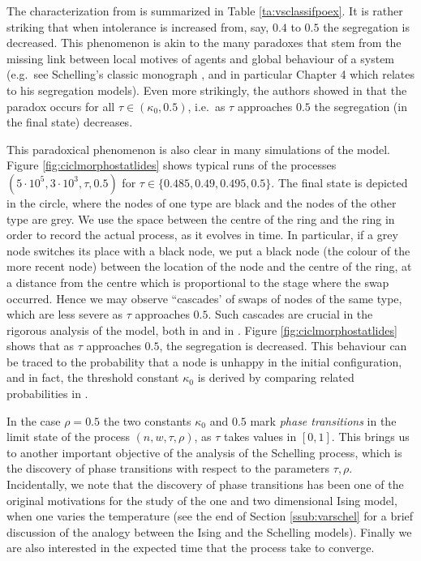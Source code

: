 \documentclass[11pt]{article}
\theoremstyle{plain}
\numberwithin{equation}{subsection}
\begin{document}
The characterization from \cite{BELschel13} is summarized in 
Table \ref{ta:vsclassifpoex}. 
It is rather striking that when intolerance is increased from, say, $0.4$ to $0.5$ 
the segregation is decreased. This phenomenon is akin to the many paradoxes
that stem from the missing link between local motives of agents and global behaviour of
a system (e.g.\ see Schelling's classic monograph \cite{TS2}, and in particular Chapter 4
which relates to his segregation models). 
Even more strikingly, the authors showed in
\cite{BELschel13} that the paradox occurs for all $\tau\in(\kappa_0, 0.5)$, i.e.\ as
$\tau$ approaches $0.5$ the segregation (in the final state) decreases.

This paradoxical phenomenon is also clear in many simulations of the model.
Figure \ref{fig:ciclmorphostatlides} shows typical runs of the processes
$(5\cdot 10^5, 3\cdot 10^3, \tau, 0.5)$ for $\tau\in\{0.485, 0.49,0.495, 0.5\}$.
The final state is depicted in the circle, where the nodes of one type are black and
the nodes of the other type are grey. We use the space between the centre of the
ring and the ring in order to record the actual process, as it evolves in time.
In particular, if a grey node switches its place with a black node, we put a black node
(the colour of the more recent node) between the location of the node and the centre of the ring,
at a distance from the centre which is proportional to the stage where the swap occurred.
Hence we may observe ``cascades' of swaps of nodes of the same type, which
are less severe  as $\tau$ approaches $0.5$. Such cascades are crucial in the
rigorous analysis of the model, 
both in
\cite{brandt:an} and in \cite{BELschel13}.
Figure \ref{fig:ciclmorphostatlides} shows  that as $\tau$ approaches $0.5$, the segregation
is decreased. This behaviour can be traced to the probability that a node is unhappy in the
initial configuration, and in fact, the threshold constant $\kappa_0$ is derived
by comparing related probabilities in \cite{BELschel13}.

In the case $\rho=0.5$
the two constants $\kappa_0$ and $0.5$ mark {\em phase transitions} in the limit state
of the process $(n, w, \tau, \rho)$, as $\tau$ takes values in $[0,1]$.
This brings us to another important objective
of the analysis of the Schelling process, which is the discovery of phase transitions with
respect to the parameters $\tau, \rho$.
Incidentally, we note that the discovery of phase transitions has been one of the
original motivations for the study of the one and two dimensional Ising model,
when one varies the temperature (see the end of Section \ref{ssub:varschel} for a brief
discussion of the analogy between the Ising and the Schelling models).
Finally we are also interested in the expected time that the process take to converge.
\end{document}
